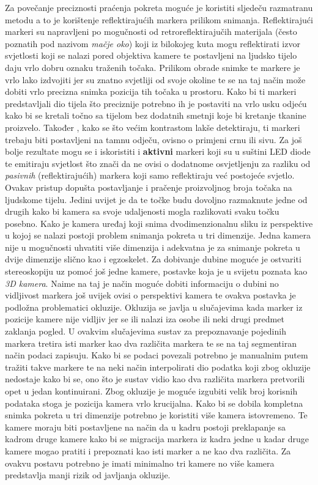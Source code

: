 \documentclass[times, utf8, diplomski]{fer}
\begin{document}
Za povečanje preciznosti praćenja pokreta moguće je koristiti sljedeču razmatranu metodu a to je korištenje reflektirajućih markera
prilikom snimanja. Reflektirajući markeri su napravljeni po mogučnosti od retroreflektirajučih materijala (često poznatih pod nazivom
\textit{mačje oko}) koji iz bilokojeg kuta
mogu reflektirati izvor svjetlosti koji se nalazi pored objektiva kamere te postavljeni na ljudsko tijelo daju vrlo dobru oznaku
traženih točaka.
Prilikom obrade snimke te markere je vrlo lako izdvojiti jer su znatno svjetliji od svoje okoline te se na taj način može dobiti
vrlo precizna snimka pozicija tih točaka u prostoru. Kako bi ti markeri predstavljali dio tijela što preciznije potrebno ih je
postaviti na vrlo usku odjeću kako bi se kretali točno sa tijelom bez dodatnih smetnji koje bi kretanje tkanine proizvelo. Također
, kako se što većim kontrastom lakše detektiraju, ti markeri trebaju biti postavljeni na tamnu odječu, ovisno o primjeni crnu ili
sivu. Za još bolje rezultate mogu
se i iskoristiti i \textbf{aktivni} markeri koji su u suštini LED diode te emitiraju svjetlost što znači da ne ovisi o dodatnome
osvjetljenju za razliku od \textit{pasivnih} (reflektirajućih) markera koji samo reflektiraju već postojeće svjetlo. Ovakav pristup dopušta
postavljanje i pračenje proizvoljnog broja točaka na ljudskome tijelu. Jedini uvijet je da te točke budu dovoljno razmaknute jedne
od drugih kako bi kamera sa svoje udaljenosti mogla razlikovati svaku točku posebno. Kako je kamera uređaj koji snima dvodimenzionalnu
sliku iz perspektive u kojoj se nalazi postoji problem snimanja pokreta u tri dimenzije. Jedna kamera nije u mogučnosti uhvatiti
više dimenzija i adekvatna je za snimanje pokreta u dvije dimenzije slično kao i egzoskelet. Za dobivanje dubine moguće je ostvariti
stereoskopiju uz pomoć još jedne kamere, postavke koja je u svijetu poznata kao \textit{3D kamera}. Naime na taj je način moguće
dobiti informaciju o dubini no vidljivost markera još uvijek ovisi o perspektivi kamera te ovakva postavka je podložna problematici
okluzije. Okluzija se javlja u slučajevima kada marker iz pozicije kamere nije vidljiv jer se ili nalazi iza osobe ili neki drugi
predmet zaklanja pogled. U ovakvim slučajevima sustav za prepoznavanje pojedinih markera tretira isti marker kao dva različita
markera te se na taj segmentiran način podaci zapisuju. Kako bi se podaci povezali potrebno je manualnim putem tražiti takve markere
te na neki način interpolirati dio podatka koji zbog okluzije nedostaje kako bi se, ono što je sustav vidio kao dva različita
markera pretvorili opet u jedan kontinuirani. Zbog okluzije je moguće izgubiti velik broj korisnih podataka stoga je pozicija
kamera vrlo krucijalna. Kako bi se dobila kompletna snimka
pokreta u tri dimenzije potrebno je koristiti više kamera istovremeno. Te kamere moraju biti postavljene na način da u kadru postoji
preklapanje sa kadrom druge kamere kako bi se migracija markera iz kadra jedne u kadar druge kamere mogao pratiti i prepoznati
kao isti marker a ne kao dva različita. Za ovakvu postavu potrebno je imati minimalno tri kamere no više kamera predstavlja
manji rizik od javljanja okluzije.
\end{document}
